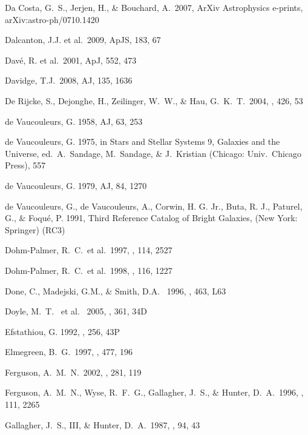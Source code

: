 \documentclass[12pt,preprint]{aastex}
\begin{document}
\begin{thebibliography}{}
Da Costa, G.~S., Jerjen, H., \& Bouchard, A.\ 2007, ArXiv Astrophysics e-prints, arXiv:astro-ph/0710.1420

Dalcanton, J.J. et al.\ 2009, ApJS, 183, 67 

Dav\'e, R. et al.\ 2001, ApJ, 552, 473

Davidge, T.J.\ 2008, AJ, 135, 1636

De Rijcke, S., Dejonghe, H., Zeilinger, W.~W., \& Hau, G.~K.~T.\ 2004, \aap, 426, 53 

de Vaucouleurs, G. 1958, AJ, 63, 253

de Vaucouleurs, G. 1975, in Stars and Stellar Systems 9, Galaxies
and the Universe, ed.\ A.\ Sandage, M.\ Sandage, \& J.\ Kristian
(Chicago: Univ.\ Chicago Press), 557

de Vaucouleurs, G. 1979, AJ, 84, 1270

de Vaucouleurs, G., de Vaucouleurs, A., Corwin, H. G. Jr.,
Buta, R. J., Paturel, G., \& Foqu\'e, P. 1991, Third Reference
Catalog of Bright Galaxies, (New York: Springer) (RC3)

Dohm-Palmer, R.~C.~et al.\ 1997, \aj, 114, 2527 

Dohm-Palmer, R.~C.~et al.\ 1998, \aj, 116, 1227 

Done, C., Madejski, G.M., \& Smith, D.A. \ 1996, \apj, 463, L63 

Doyle, M.~T. ~et al. \ 2005, \mnras, 361, 34D 

Efstathiou, G. 1992, \mnras, 256, 43P 

Elmegreen, B.~G.\ 1997, \apj, 477, 196 

Ferguson, A.~M.~N.\ 2002, \apss, 281, 119 

Ferguson, A.~M.~N., Wyse, R.~F.~G., Gallagher, J.~S., \& Hunter, D.~A.\ 
1996, \aj, 111, 2265 

Gallagher, J.~S., III, \& Hunter, D.~A.\ 1987, \aj, 94, 43 


\end{thebibliography}
\end{document}
